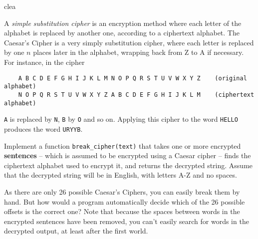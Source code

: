 clea\documentclass{article}
\begin{document}
A \emph{simple substitution cipher} is an encryption method where each letter of the alphabet is replaced by another one, according to a ciphertext alphabet. The Caesar's Cipher is a very simply substitution cipher, where each letter is replaced by one $n$ places later in the alphabet, wrapping back from Z to A if necessary.
For instance, in the cipher
\begin{verbatim}
    A B C D E F G H I J K L M N O P Q R S T U V W X Y Z    (original alphabet)
    N O P Q R S T U V W X Y Z A B C D E F G H I J K L M    (ciphertext alphabet)
\end{verbatim}
\texttt{A} is replaced by \texttt{N}, \texttt{B} by \texttt{O} and so on. Applying this cipher to the word \texttt{HELLO} produces the word \texttt{URYYB}. 

Implement a function \texttt{break\_cipher(text)} that takes one or more encrypted \textbf{sentences}
-- which is assumed to be encrypted using a Caesar cipher -- finds the
ciphertext alphabet used to encrypt it, and returns the decrypted
string. Assume that the decrypted string will be in English, with
letters A-Z and no spaces.  

As there are only 26 possible Caesar's Ciphers, you can easily break
them by hand.  But how would a program automatically decide which of
the 26 possible offsets is the correct one?  Note that because the
spaces between words in the encrypted sentences have been removed, you
can't easily search for words in the decrypted output, at least after
the first world.
\end{document}
